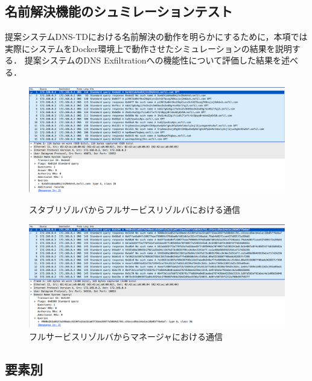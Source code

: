 \subsection{名前解決機能のシュミレーションテスト}
\label{sec:eval-tunnel}
提案システムDNS-TDにおける名前解決の動作を明らかにするために，本項では実際にシステムをDocker環境上で動作させたシミュレーションの結果を説明する．
提案システムのDNS Exfiltrationへの機能性について評価した結果を述べる．


\begin{figure}[p]
 \centering
 \includegraphics[width=14.5cm]{figure/stab-fullservice.png}
 \vspace{-1cm}
 \caption{スタブリゾルバからフルサービスリゾルバにおける通信}
 \label{fig:fullservice-manager}
 \vspace{1cm}
 \includegraphics[width=14.5cm]{figure/fullresolver-manager.png}
 \vspace{-1cm}
 \caption{フルサービスリゾルバからマネージャにおける通信}
 \label{fig:fullservice-manager}
\end{figure}

\newpage
\subsection{要素別}
